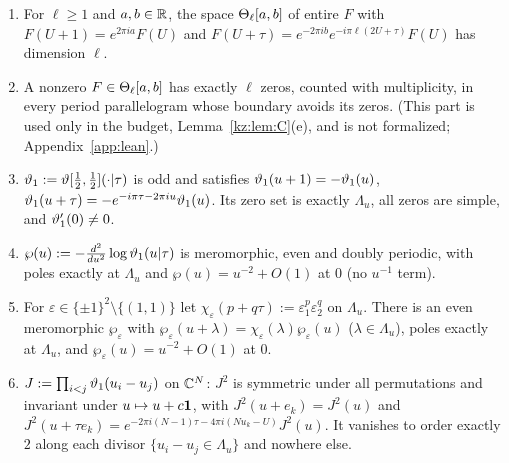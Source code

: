 \begin{lemma}\label{kz:lem:theta}
\begin{enumerate}
\item[(a)] For $\ell\ge1$ and $a,b\in\mathbb{R}$, the space $\Theta_\ell[a,b]$ of entire $F$ with $F(U+1)=e^{2\pi ia}F(U)$
and $F(U+\tau)=e^{-2\pi ib}e^{-i\pi\ell(2U+\tau)}F(U)$ has dimension $\ell$.
\item[(b)] A nonzero $F\in\Theta_\ell[a,b]$ has exactly $\ell$ zeros, counted with multiplicity, in every
period parallelogram whose boundary avoids its zeros. (This part is used only in the budget, Lemma~\ref{kz:lem:C}(e), and
is not formalized; Appendix~\ref{app:lean}.)
\item[(c)] $\vartheta_1:=\vartheta[\frac12,\frac12](\cdot|\tau)$ is odd and satisfies $\vartheta_1(u+1)=-\vartheta_1(u)$,
$\vartheta_1(u+\tau)=-e^{-i\pi\tau-2\pi iu}\vartheta_1(u)$. Its zero set is exactly $\Lambda_u$, all zeros are simple,
and $\vartheta_1'(0)\neq0$.
\item[(d)] $\wp(u):=-\frac{d^2}{du^2}\log\vartheta_1(u|\tau)$ is meromorphic, even and doubly periodic, with poles
exactly at $\Lambda_u$ and $\wp(u)=u^{-2}+O(1)$ at $0$ (no $u^{-1}$ term).
\item[(e)] For $\varepsilon\in\{\pm1\}^2\setminus\{(1,1)\}$ let $\chi_\varepsilon(p+q\tau):=\varepsilon_1^p\varepsilon_2^q$ on
$\Lambda_u$. There is an even meromorphic $\wp_\varepsilon$ with $\wp_\varepsilon(u+\lambda)=\chi_\varepsilon(\lambda)\wp_\varepsilon(u)$
($\lambda\in\Lambda_u$), poles exactly at $\Lambda_u$, and $\wp_\varepsilon(u)=u^{-2}+O(1)$ at $0$.
\item[(f)] $J:=\prod_{i<j}\vartheta_1(u_i-u_j)$ on $\mathbb{C}^N$: $J^2$ is symmetric under all permutations and
invariant under $u\mapsto u+c\mathbf{1}$, with $J^2(u+e_k)=J^2(u)$ and
$J^2(u+\tau e_k)=e^{-2\pi i(N-1)\tau-4\pi i(Nu_k-U)}J^2(u)$. It vanishes to order exactly $2$ along each
divisor $\{u_i-u_j\in\Lambda_u\}$ and nowhere else.
\end{enumerate}
\end{lemma}

